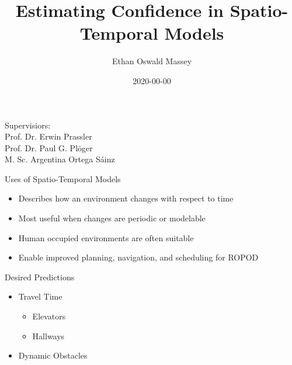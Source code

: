\documentclass{beamer}
\author[Ethan Oswald Massey]{Ethan Oswald Massey}
\title{Estimating Confidence in Spatio-Temporal Models}
\institute[HBRS]{Hochschule Bonn-Rhein-Sieg}
\date{2020-00-00}
\begin{document}
{
\begin{frame}
\titlepage
\vspace{5mm}

Supervisiors: \\ Prof. Dr. Erwin Prassler  \\ Prof. Dr. Paul G. Pl\"{o}ger \\ M. Sc. Argentina Ortega S\'{a}inz
\end{frame}
}

\begin{frame}[t]{Uses of Spatio-Temporal Models}
  \begin{itemize}
    \setlength\itemsep{1em}
    \item Describes how an environment changes with respect to time
    \item Most useful when changes are periodic or modelable
    \item Human occupied environments are often suitable
    \item Enable improved planning, navigation, and scheduling for ROPOD
  \end{itemize}

  \begin{block}{Desired Predictions}
    \begin{itemize}
    \item Travel Time
      \begin{itemize}
        \item Elevators
        \item Hallways
      \end{itemize}
    \item Dynamic Obstacles
    \end{itemize}
  \end{block}
\end{frame}
\end{document}
